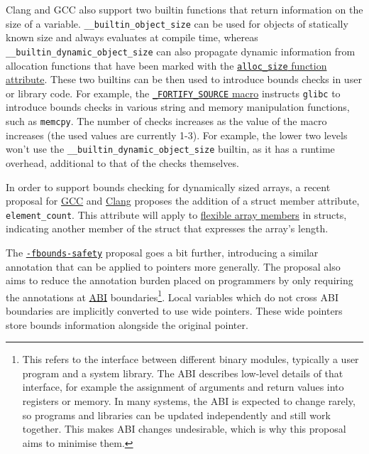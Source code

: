 \documentclass[
  a4paper,
]{report}
\begin{document}
Clang and GCC also support two builtin functions that return information
on the size of a variable. \texttt{\_\_builtin\_object\_size} can be
used for objects of statically known size and always evaluates at
compile time, whereas \texttt{\_\_builtin\_dynamic\_object\_size} can
also propagate dynamic information from allocation functions that have
been marked with the
\href{https://gcc.gnu.org/onlinedocs/gcc-4.7.2/gcc/Function-Attributes.html}{\texttt{alloc\_size}
function attribute}. These two builtins can be then used to introduce
bounds checks in user or library code. For example, the
\href{https://man7.org/linux/man-pages/man7/feature_test_macros.7.html}{\texttt{\_FORTIFY\_SOURCE}
macro} instructs \texttt{glibc} to introduce bounds checks in various
string and memory manipulation functions, such as \texttt{memcpy}. The
number of checks increases as the value of the macro increases (the used
values are currently 1-3). For example, the lower two levels won't use
the \texttt{\_\_builtin\_dynamic\_object\_size} builtin, as it has a
runtime overhead, additional to that of the checks themselves.

In order to support bounds checking for dynamically sized arrays, a
recent proposal for
\href{https://gcc.gnu.org/bugzilla/show_bug.cgi?id=108896}{GCC} and
\href{https://reviews.llvm.org/D148381}{Clang} proposes the addition of
a struct member attribute, \texttt{element\_count}. This attribute will
apply to
\href{https://en.wikipedia.org/wiki/Flexible_array_member}{flexible
array members} in structs, indicating another member of the struct that
expresses the array's length.

The
\href{https://discourse.llvm.org/t/rfc-enforcing-bounds-safety-in-c-fbounds-safety/70854}{\texttt{-fbounds-safety}}
proposal goes a bit further, introducing a similar annotation that can
be applied to pointers more generally. The proposal also aims to reduce
the annotation burden placed on programmers by only requiring the
annotations at
\href{https://en.wikipedia.org/wiki/Application_binary_interface}{ABI} boundaries\footnote{This refers to the interface
  between different binary modules, typically a user program and a
  system library. The ABI describes low-level details of that interface,
  for example the assignment of arguments and return values into
  registers or memory. In many systems, the ABI is expected to change
  rarely, so programs and libraries can be updated independently and
  still work together. This makes ABI changes undesirable, which is why
  this proposal aims to minimise them.}. Local variables which do not
cross ABI boundaries are implicitly converted to use wide pointers.
These wide pointers store bounds information alongside the original
pointer.
\end{document}

